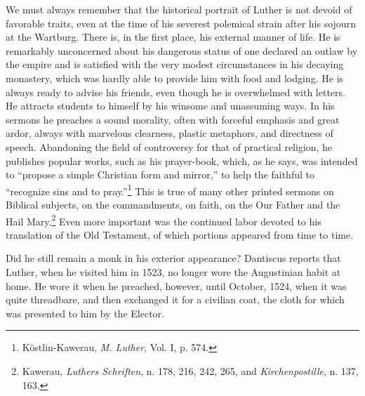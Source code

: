 We must always remember that the historical portrait of Luther
is not devoid of favorable traits, even at the time of his severest
polemical strain after his sojourn at the Wartburg. There is, in the
first place, his external manner of life. He is remarkably unconcerned
about his dangerous status of one declared an outlaw by the empire
and is satisfied with the very modest circumstances in his decaying
monastery, which was hardly able to provide him with food and
lodging. He is always ready to advise his friends, even though he is
overwhelmed with letters. He attracts students to himself by his
winsome and unassuming ways. In his sermons he preaches a sound
morality, often with forceful emphasis and great ardor, always with
marvelous clearness, plastic metaphors, and directness of speech.
Abandoning the field of controversy for that of practical religion, he
publishes popular works, such as his prayer-book, which, as he says,
was intended to “propose a simple Christian form and mirror,”
to help the faithful to “recognize sins and to pray.”\footnote
{Köstlin-Kawerau, \textit{M. Luther}, Vol. I, p. 574.}
This is true of many other printed sermons on Biblical subjects, on the commandments,
on faith, on the Our Father and the Hail Mary.\footnote
{Kawerau, \textit{Luthers Schriften}, n. 178, 216, 242, 265, and \textit{Kirchenpostille}, n. 137, 163.}
Even more important was the continued labor devoted to his translation of the
Old Testament, of which portions appeared from time to time.

Did he still remain a monk in his exterior appearance? Dantiscus
reports that Luther, when he visited him in 1523, no longer wore
the Augustinian habit at home. He wore it when he preached, however,
until October, 1524, when it was quite threadbare, and then exchanged it
for a civilian coat, the cloth for which was presented to
him by the Elector.
